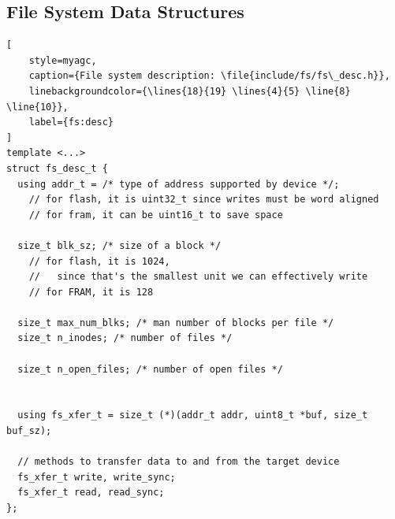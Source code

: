 \subsection{File System Data Structures}

\begin{lstlisting}[
    style=myagc,
    caption={File system description: \file{include/fs/fs\_desc.h}},
    linebackgroundcolor={\lines{18}{19} \lines{4}{5} \line{8} \line{10}},
    label={fs:desc}
]
template <...>
struct fs_desc_t {
  using addr_t = /* type of address supported by device */;
    // for flash, it is uint32_t since writes must be word aligned
    // for fram, it can be uint16_t to save space 

  size_t blk_sz; /* size of a block */
    // for flash, it is 1024, 
    //   since that's the smallest unit we can effectively write
    // for FRAM, it is 128

  size_t max_num_blks; /* man number of blocks per file */
  size_t n_inodes; /* number of files */

  size_t n_open_files; /* number of open files */


  using fs_xfer_t = size_t (*)(addr_t addr, uint8_t *buf, size_t buf_sz);

  // methods to transfer data to and from the target device
  fs_xfer_t write, write_sync;
  fs_xfer_t read, read_sync;
};
\end{lstlisting}


